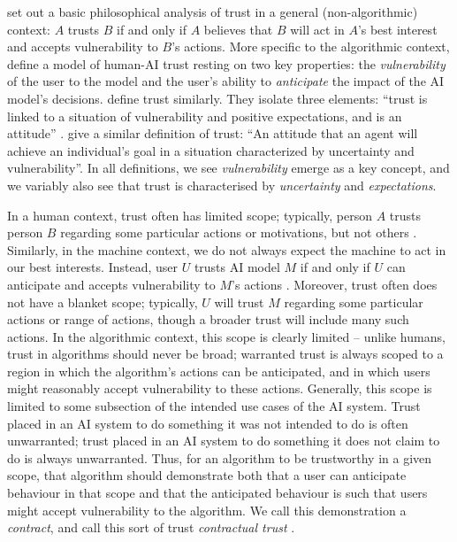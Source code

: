 \textcite{jacovi_formalizing_2021} set out a basic philosophical analysis of trust in a general (non-algorithmic) context: $A$ trusts $B$ if and only if $A$ believes that $B$ will act in $A$'s best interest and accepts vulnerability to $B$'s actions. More specific to the algorithmic context, \textcite{jacovi_formalizing_2021} define a model of human-AI trust resting on two key properties: the \textit{vulnerability} of the user to the model and the user's ability to \textit{anticipate} the impact of the AI model’s decisions. \textcite{vereschak_how_2021} define trust similarly. They isolate three elements: ``trust is linked to a situation of vulnerability and positive expectations, and is an attitude'' \cite{vereschak_how_2021}. \textcite{lee_trust_2004} give a similar definition of trust: ``An attitude that an agent will achieve an individual's goal in a situation characterized by uncertainty and vulnerability''. In all definitions, we see \emph{vulnerability} emerge as a key concept, and we variably also see that trust is characterised by \emph{uncertainty} and \emph{expectations}.

In a human context, trust often has limited scope; typically, person $A$ trusts person $B$ regarding some particular actions or motivations, but not others \cite{jacovi_formalizing_2021}. Similarly, in the machine context, we do not always expect the machine to act in our best interests. Instead, user $U$ trusts AI model $M$ if and only if $U$ can anticipate and accepts vulnerability to $M$'s actions \cite{jacovi_formalizing_2021}. Moreover, trust often does not have a blanket scope; typically, $U$ will trust $M$ regarding some particular actions or range of actions, though a broader trust will include many such actions. In the algorithmic context, this scope is clearly limited – unlike humans, trust in algorithms should never be broad; warranted trust is always scoped to a region in which the algorithm's actions can be anticipated, and in which users might reasonably accept vulnerability to these actions. Generally, this scope is limited to some subsection of the intended use cases of the AI system. Trust placed in an AI system to do something it was not intended to do is often unwarranted; trust placed in an AI system to do something it does not claim to do is always unwarranted. Thus, for an algorithm to be trustworthy in a given scope, that algorithm should demonstrate both that a user can anticipate behaviour in that scope and that the anticipated behaviour is such that users might accept vulnerability to the algorithm. We call this demonstration a \emph{contract}, and call this sort of trust \emph{contractual trust} \cite{jacovi_formalizing_2021}.

